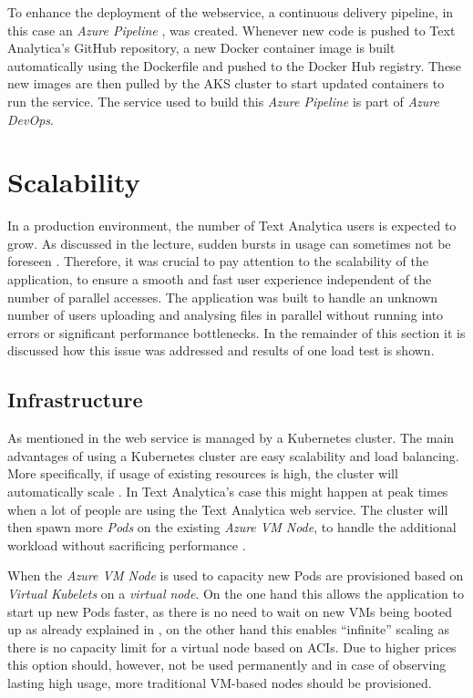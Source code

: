 \documentclass[conference]{IEEEtran}
\begin{document}
To enhance the deployment of the webservice, a continuous delivery pipeline, in this case an \textit{Azure Pipeline} \cite{AzurePipeline}, was created. Whenever new code is pushed to Text Analytica’s GitHub repository, a new Docker container image is built automatically using the Dockerfile and pushed to the Docker Hub registry. These new images are then pulled by the AKS cluster to start updated containers to run the service. The service used to build this \textit{Azure Pipeline} is part of \textit{Azure DevOps}.

\section{Scalability}
\label{sec:scalability}
In a production environment, the number of Text Analytica users is expected to grow. As discussed in the lecture, sudden bursts in usage can sometimes not be foreseen \cite{Animoto}. Therefore, it was crucial to pay attention to the scalability of the application, to ensure a smooth and fast user experience independent of the number of parallel accesses. The application was built to handle an unknown number of users uploading and analysing files in parallel without running into errors or significant performance bottlenecks. In the remainder of this section it is discussed how this issue was addressed and results of one load test is shown.

\subsection{Infrastructure}
As mentioned in  the web service is managed by a Kubernetes cluster. The main advantages of using a Kubernetes cluster are easy scalability and load balancing. More specifically, if usage of existing resources is high, the cluster will automatically scale \cite{KubernetesScaling, KubernetesAutoscaler}. In Text Analytica’s case this might happen at peak times when a lot of people are using the Text Analytica web service. The cluster will then spawn more \textit{Pods} on the existing \textit{Azure VM Node}, to handle the additional workload without sacrificing performance \cite{MicrosoftAzureKubernetesService}.

When the \textit{Azure VM Node} is used to capacity new Pods are provisioned based on \textit{Virtual Kubelets} on a \textit{virtual node}. On the one hand this allows the application to start up new Pods faster, as there is no need to wait on new VMs being booted up as already explained in , on the other hand this enables “infinite” scaling as there is no capacity limit for a virtual node based on ACIs. Due to higher prices this option should, however, not be used permanently and in case of observing lasting high usage, more traditional VM-based nodes should be provisioned.
\end{document}

